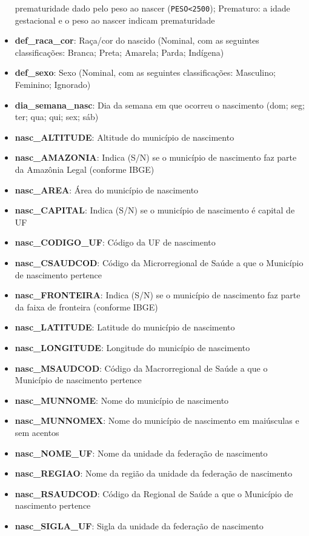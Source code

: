 \documentclass[
]{article}
\begin{document}
\begin{itemize}
  prematuridade dado pelo peso ao nascer (\texttt{PESO\textless{}2500});
  Prematuro: a idade gestacional e o peso ao nascer indicam
  prematuridade
\item
  \textbf{def\_raca\_cor}: Raça/cor do nascido (Nominal, com as
  seguintes classificações: Branca; Preta; Amarela; Parda; Indígena)
\item
  \textbf{def\_sexo}: Sexo (Nominal, com as seguintes classificações:
  Masculino; Feminino; Ignorado)
\item
  \textbf{dia\_semana\_nasc}: Dia da semana em que ocorreu o nascimento
  (dom; seg; ter; qua; qui; sex; sáb)
\item
  \textbf{nasc\_ALTITUDE}: Altitude do município de nascimento
\item
  \textbf{nasc\_AMAZONIA}: Indica (S/N) se o município de nascimento faz
  parte da Amazônia Legal (conforme IBGE)
\item
  \textbf{nasc\_AREA}: Área do município de nascimento
\item
  \textbf{nasc\_CAPITAL}: Indica (S/N) se o município de nascimento é
  capital de UF
\item
  \textbf{nasc\_CODIGO\_UF}: Código da UF de nascimento
\item
  \textbf{nasc\_CSAUDCOD}: Código da Microrregional de Saúde a que o
  Município de nascimento pertence
\item
  \textbf{nasc\_FRONTEIRA}: Indica (S/N) se o município de nascimento
  faz parte da faixa de fronteira (conforme IBGE)
\item
  \textbf{nasc\_LATITUDE}: Latitude do município de nascimento
\item
  \textbf{nasc\_LONGITUDE}: Longitude do município de nascimento
\item
  \textbf{nasc\_MSAUDCOD}: Código da Macrorregional de Saúde a que o
  Município de nascimento pertence
\item
  \textbf{nasc\_MUNNOME}: Nome do município de nascimento
\item
  \textbf{nasc\_MUNNOMEX}: Nome do município de nascimento em maiúsculas
  e sem acentos
\item
  \textbf{nasc\_NOME\_UF}: Nome da unidade da federação de nascimento
\item
  \textbf{nasc\_REGIAO}: Nome da região da unidade da federação de
  nascimento
\item
  \textbf{nasc\_RSAUDCOD}: Código da Regional de Saúde a que o Município
  de nascimento pertence
\item
  \textbf{nasc\_SIGLA\_UF}: Sigla da unidade da federação de nascimento

\end{itemize}
\end{document}

